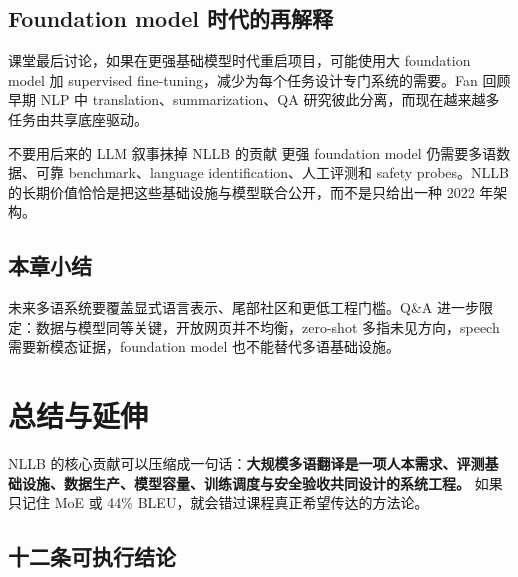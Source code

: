 \documentclass[a4paper]{article}
\begin{document}
\subsection{Foundation model 时代的再解释}

课堂最后讨论，如果在更强基础模型时代重启项目，可能使用大 foundation model 加 supervised fine-tuning，减少为每个任务设计专门系统的需要。Fan 回顾早期 NLP 中 translation、summarization、QA 研究彼此分离，而现在越来越多任务由共享底座驱动。


\begin{warningbox}{不要用后来的 LLM 叙事抹掉 NLLB 的贡献}
更强 foundation model 仍需要多语数据、可靠 benchmark、language identification、人工评测和 safety probes。NLLB 的长期价值恰恰是把这些基础设施与模型联合公开，而不是只给出一种 2022 年架构。
\end{warningbox}

\subsection{本章小结}

未来多语系统要覆盖显式语言表示、尾部社区和更低工程门槛。Q\&A 进一步限定：数据与模型同等关键，开放网页并不均衡，zero-shot 多指未见方向，speech 需要新模态证据，foundation model 也不能替代多语基础设施。

\section{总结与延伸}

NLLB 的核心贡献可以压缩成一句话：\textbf{大规模多语翻译是一项人本需求、评测基础设施、数据生产、模型容量、训练调度与安全验收共同设计的系统工程。} 如果只记住 MoE 或 44\% BLEU，就会错过课程真正希望传达的方法论。

\subsection{十二条可执行结论}
\end{document}
